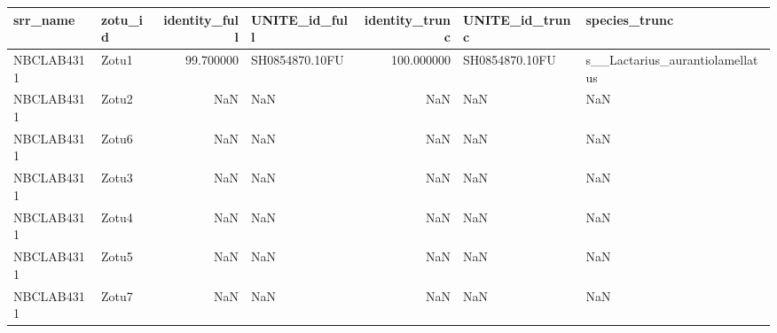 \begin{tabular}{llrlrll}
\toprule
srr\_name & zotu\_id & identity\_full & UNITE\_id\_full & identity\_trunc & UNITE\_id\_trunc & species\_trunc \\
\midrule
NBCLAB4311 & Zotu1 & 99.700000 & SH0854870.10FU & 100.000000 & SH0854870.10FU & s\_\_Lactarius\_aurantiolamellatus \\
NBCLAB4311 & Zotu2 & NaN & NaN & NaN & NaN & NaN \\
NBCLAB4311 & Zotu6 & NaN & NaN & NaN & NaN & NaN \\
NBCLAB4311 & Zotu3 & NaN & NaN & NaN & NaN & NaN \\
NBCLAB4311 & Zotu4 & NaN & NaN & NaN & NaN & NaN \\
NBCLAB4311 & Zotu5 & NaN & NaN & NaN & NaN & NaN \\
NBCLAB4311 & Zotu7 & NaN & NaN & NaN & NaN & NaN \\
\bottomrule
\end{tabular}

